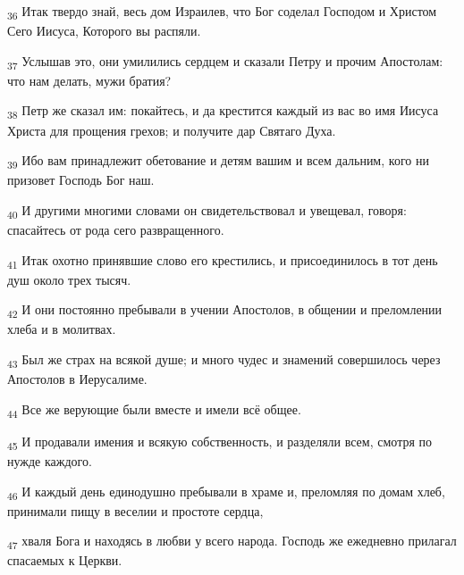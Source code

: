 \begin{tcolorbox}
\textsubscript{36} Итак твердо знай, весь дом Израилев, что Бог соделал Господом и Христом Сего Иисуса, Которого вы распяли.
\end{tcolorbox}
\begin{tcolorbox}
\textsubscript{37} Услышав это, они умилились сердцем и сказали Петру и прочим Апостолам: что нам делать, мужи братия?
\end{tcolorbox}
\begin{tcolorbox}
\textsubscript{38} Петр же сказал им: покайтесь, и да крестится каждый из вас во имя Иисуса Христа для прощения грехов; и получите дар Святаго Духа.
\end{tcolorbox}
\begin{tcolorbox}
\textsubscript{39} Ибо вам принадлежит обетование и детям вашим и всем дальним, кого ни призовет Господь Бог наш.
\end{tcolorbox}
\begin{tcolorbox}
\textsubscript{40} И другими многими словами он свидетельствовал и увещевал, говоря: спасайтесь от рода сего развращенного.
\end{tcolorbox}
\begin{tcolorbox}
\textsubscript{41} Итак охотно принявшие слово его крестились, и присоединилось в тот день душ около трех тысяч.
\end{tcolorbox}
\begin{tcolorbox}
\textsubscript{42} И они постоянно пребывали в учении Апостолов, в общении и преломлении хлеба и в молитвах.
\end{tcolorbox}
\begin{tcolorbox}
\textsubscript{43} Был же страх на всякой душе; и много чудес и знамений совершилось через Апостолов в Иерусалиме.
\end{tcolorbox}
\begin{tcolorbox}
\textsubscript{44} Все же верующие были вместе и имели всё общее.
\end{tcolorbox}
\begin{tcolorbox}
\textsubscript{45} И продавали имения и всякую собственность, и разделяли всем, смотря по нужде каждого.
\end{tcolorbox}
\begin{tcolorbox}
\textsubscript{46} И каждый день единодушно пребывали в храме и, преломляя по домам хлеб, принимали пищу в веселии и простоте сердца,
\end{tcolorbox}
\begin{tcolorbox}
\textsubscript{47} хваля Бога и находясь в любви у всего народа. Господь же ежедневно прилагал спасаемых к Церкви.
\end{tcolorbox}

